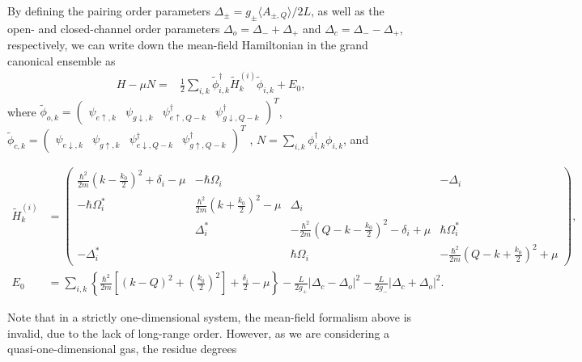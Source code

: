 \documentclass[a4paper, aps,pra, twocolumn, superscriptaddress, showpacs]{revtex4}
\begin{document}
By defining the pairing order parameters $\Delta_{\pm}=g_{\pm}\langle A_{\pm,Q}\rangle/2L$, as well as the open- and closed-channel order parameters $\Delta_o=\Delta_-+\Delta_+$ and $\Delta_c=\Delta_--\Delta_+$, respectively, we can write down the mean-field Hamiltonian in the grand canonical ensemble as
\begin{align}
  H-\mu N = &  \frac{1}{2}\sum_{i,k}\tilde{\phi}_{i,k}^{\dagger}\tilde{H}^{\left(i\right)}_{k}\tilde{\phi}_{i,k}+E_0, \label{eqn:Hfull_op}
\end{align}
where $\tilde{\phi}_{o,k}=\left(\begin{array}{cccc}
  \psi_{e\uparrow, k} & \psi_{g\downarrow, k} & \psi_{e\uparrow,Q-k}^{\dagger} & \psi_{g\downarrow,Q-k}^{\dagger}\end{array}\right)^{T}$,
$\tilde{\phi}_{c,k}=\left(\begin{array}{cccc}
\psi_{e\downarrow, k} & \psi_{g\uparrow, k} & \psi_{e\downarrow,Q-k}^{\dagger} & \psi_{g\uparrow,Q-k}^{\dagger} \end{array}\right)^{T}$
, $N=\sum_{i,k}\phi_{i,k}^{\dagger}\phi_{i,k}$, and
\begin{widetext}
\begin{align}
  \tilde{H}^{\left(i\right)}_{k}&=\left(\begin{array}{cccc}
\frac{\hbar^{2}}{2m}\left(k-\frac{k_{0}}{2}\right)^{2}+\delta_{i}-\mu & -\hbar\Omega_{i} &  & -\Delta_{i}\\
-\hbar\Omega_{i}^{*} & \frac{\hbar^{2}}{2m}\left(k+\frac{k_{0}}{2}\right)^{2}-\mu & \Delta_{i}\\
 & \Delta_{i}^{*} & -\frac{\hbar^{2}}{2m}\left(Q-k-\frac{k_{0}}{2}\right)^{2}-\delta_{i}+\mu & \hbar\Omega_{i}^{*}\\
-\Delta_{i}^{*} &  & \hbar\Omega_{i} & -\frac{\hbar^{2}}{2m}\left(Q-k+\frac{k_{0}}{2}\right)^{2}+\mu
\end{array}\right),\label{eqn:Hfull}\\
  E_0&=\sum_{i,k} \left\{ \frac{\hbar^{2}}{2m}\left[\left(k-Q\right)^{2}+\left(\frac{k_{0}}{2}\right)^{2}\right]+\frac{\delta_{i}}{2}-\mu\right\}  -\frac{L}{2g_{+}}\left|\Delta_{c}-\Delta_{o}\right|^{2}-\frac{L}{2g_{-}}\left|\Delta_{c}+\Delta_{o}\right|^{2} . \label{eqn:thermoBare}
\end{align}
\end{widetext}
Note that in a strictly one-dimensional system, the mean-field formalism above is invalid, due to the lack of long-range
order. However, as we are considering a quasi-one-dimensional gas, the residue degrees
\end{document}
